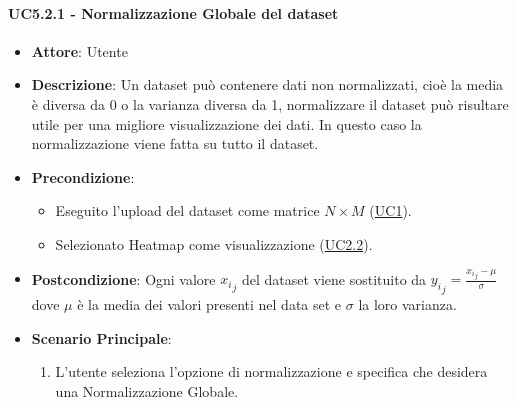    \paragraph{UC5.2.1 - Normalizzazione Globale del dataset}
    \label{uc5.2.1}
    \begin{itemize}
    \item \textbf{Attore}: Utente
    \item \textbf{Descrizione}: Un dataset può contenere dati non normalizzati, cioè la media è diversa da 0 o la varianza diversa da 1, normalizzare il dataset può risultare utile per una migliore visualizzazione dei dati.
    In questo caso la normalizzazione viene fatta su tutto il dataset.
    \item \textbf{Precondizione}: 
    \begin{itemize}
        \item Eseguito l'upload del dataset come matrice $N\times M$ (\hyperref[uc1]{UC1}).
        \item Selezionato Heatmap come visualizzazione (\hyperref[uc2.2]{UC2.2}).
    \end{itemize}  
    \item \textbf{Postcondizione}:  Ogni valore ${x_i}_j$ del dataset viene sostituito da $ {y_i}_j = \frac{{x_i}_j - \mu}{\sigma}$ dove $\mu$ è la media dei valori presenti nel data set e $\sigma$ la loro varianza.
    \item \textbf{Scenario Principale}: 
    \begin{enumerate}
        \item L'utente seleziona l'opzione di normalizzazione e specifica che desidera una Normalizzazione Globale.
    \end{enumerate}  
    \end{itemize}
    
